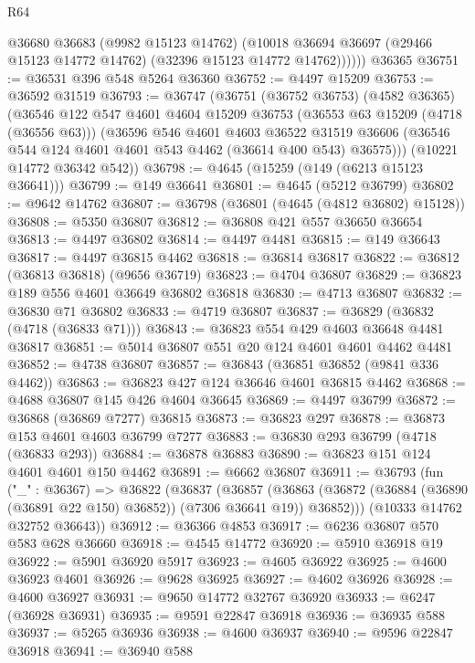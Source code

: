 \begin{lexlean}{R64}
\begin{coremodule}
            @36680
            @36683
            (@9982 @15123 @14762)
            (@10018 @36694 @36697 (@29466 @15123 @14772 @14762) (@32396 @15123 @14772 @14762))))))
    @36365
@36751 := @36531 @396 @548 @5264 @36360
@36752 := @4497 @15209
@36753 := @36592 @31519
@36793 := @36747
    (@36751
      (@36752 @36753)
      (@4582 @36365)
      (@36546
        @122
        @547
        @4601
        @4604
        @15209
        @36753
        (@36553 @63 @15209 (@4718 (@36556 @63)))
        (@36596
          @546
          @4601
          @4603
          @36522
          @31519
          @36606
          (@36546 @544 @124 @4601 @4601 @543 @4462 (@36614 @400 @543) @36575)))
      (@10221 @14772 @36342 @542))
@36798 := @4645 (@15259 (@149 (@6213 @15123 @36641)))
@36799 := @149 @36641
@36801 := @4645 (@5212 @36799)
@36802 := @9642 @14762
@36807 := @36798 (@36801 (@4645 (@4812 @36802) @15128))
@36808 := @5350 @36807
@36812 := @36808 @421 @557 @36650 @36654
@36813 := @4497 @36802
@36814 := @4497 @4481
@36815 := @149 @36643
@36817 := @4497 @36815 @4462
@36818 := @36814 @36817
@36822 := @36812 (@36813 @36818) (@9656 @36719)
@36823 := @4704 @36807
@36829 := @36823 @189 @556 @4601 @36649 @36802 @36818
@36830 := @4713 @36807
@36832 := @36830 @71 @36802
@36833 := @4719 @36807
@36837 := @36829 (@36832 (@4718 (@36833 @71)))
@36843 := @36823 @554 @429 @4603 @36648 @4481 @36817
@36851 := @5014 @36807 @551 @20 @124 @4601 @4601 @4462 @4481
@36852 := @4738 @36807
@36857 := @36843 (@36851 @36852 (@9841 @336 @4462))
@36863 := @36823 @427 @124 @36646 @4601 @36815 @4462
@36868 := @4688 @36807 @145 @426 @4604 @36645
@36869 := @4497 @36799
@36872 := @36868 (@36869 @7277) @36815
@36873 := @36823 @297
@36878 := @36873 @153 @4601 @4603 @36799 @7277
@36883 := @36830 @293 @36799 (@4718 (@36833 @293))
@36884 := @36878 @36883
@36890 := @36823 @151 @124 @4601 @4601 @150 @4462
@36891 := @6662 @36807
@36911 := @36793
    (fun ("_" : @36367) =>
    @36822
      (@36837
        (@36857
          (@36863 (@36872 (@36884 (@36890 (@36891 @22 @150) @36852)) (@7306 @36641 @19)) @36852)))
      (@10333 @14762 @32752 @36643))
@36912 := @36366 @4853
@36917 := @6236 @36807 @570 @583 @628 @36660
@36918 := @4545 @14772
@36920 := @5910 @36918 @19
@36922 := @5901 @36920 @5917
@36923 := @4605 @36922
@36925 := @4600 @36923 @4601
@36926 := @9628 @36925
@36927 := @4602 @36926
@36928 := @4600 @36927
@36931 := @9650 @14772 @32767 @36920
@36933 := @6247 (@36928 @36931)
@36935 := @9591 @22847 @36918
@36936 := @36935 @588
@36937 := @5265 @36936
@36938 := @4600 @36937
@36940 := @9596 @22847 @36918
@36941 := @36940 @588

\end{coremodule}
\end{lexlean}
